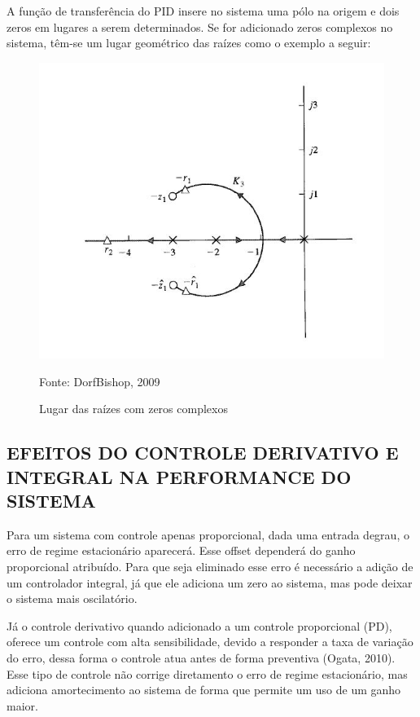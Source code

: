 \documentclass[a4paper,12pt]{article}
\begin{document}
A função de transferência do PID insere no sistema uma pólo na origem e dois zeros em lugares a serem determinados. Se for adicionado zeros complexos no sistema, têm-se um lugar geométrico das raízes como o exemplo a seguir: 

\begin{figure}[!h]
\centering
\includegraphics[scale=1]{lugar-das-raizes-pid.JPG}
\caption{Lugar das raízes com zeros complexos}
\label{fig:lgr}
{Fonte: DorfBishop, 2009}
\end{figure}


\subsection{EFEITOS DO CONTROLE DERIVATIVO E INTEGRAL NA PERFORMANCE DO SISTEMA}
\hspace{4ex}
Para um sistema com controle apenas proporcional, dada uma entrada degrau, o erro de regime estacionário aparecerá. Esse offset dependerá do ganho proporcional atribuído. Para que seja eliminado esse erro é necessário a adição de um controlador integral, já que ele adiciona um zero ao sistema, mas pode deixar o sistema mais oscilatório.

Já o controle derivativo quando adicionado a um controle proporcional (PD), oferece um controle com alta sensibilidade, devido a responder a taxa de variação do erro, dessa forma o controle atua antes de forma preventiva (Ogata, 2010). Esse tipo de controle não corrige diretamento o erro de regime estacionário, mas adiciona amortecimento ao sistema de forma que permite um uso de um ganho maior.
\end{document}
